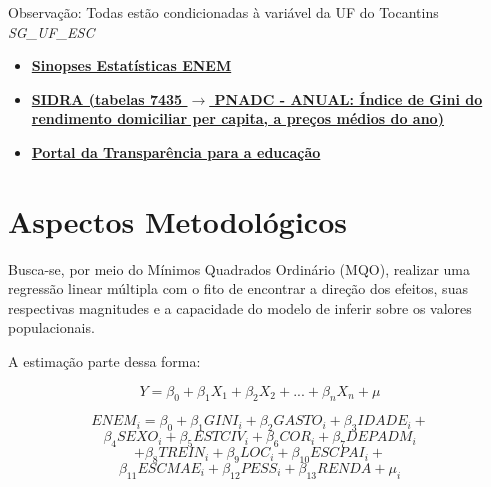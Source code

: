 \documentclass[tcc1,project]{uftex}
\begin{document}
Observação: Todas estão condicionadas à variável da UF do Tocantins \textit{SG\_UF\_ESC}

\begin{itemize}

\item \textbf{\href{https://www.gov.br/inep/pt-br/acesso-a-informacao/dados-abertos/sinopses}{Sinopses Estatísticas ENEM}}

\item \textbf{\href{https://sidra.ibge.gov.br/pesquisa/pnadca/tabelas}{SIDRA (tabelas 7435 $\rightarrow$ PNADC - ANUAL: Índice de Gini do rendimento domiciliar per capita, a preços médios do ano)}}

\item \textbf{\href{https://portaldatransparencia.gov.br/funcoes/12-educacao?ano=2024}{Portal da Transparência para a educação}}

\end{itemize}

\section*{Aspectos Metodológicos}

Busca-se, por meio do Mínimos Quadrados Ordinário (MQO), realizar uma regressão linear múltipla com o fito de encontrar a direção dos efeitos, suas respectivas magnitudes e a capacidade do modelo de inferir sobre os valores populacionais. 

A estimação parte dessa forma:

\begin{equation}	
	Y = \beta_0 + \beta_1X_1 + \beta_2X_2 + ... + \beta_nX_n + \mu  
\end{equation}

\begin{equation}
	ENEM_i = \beta_0 + \beta_1GINI_i + \beta_2GASTO_i + \beta_3IDADE_i +
\end{equation}
\begin{equation*}
	\beta_4SEXO_i + \beta_5ESTCIV_i + \beta_6COR_i + \beta_7DEPADM_i
\end{equation*}
\begin{equation*}
	+ \beta_8TREIN_i + \beta_9LOC_i + \beta_10ESCPAI_i +
\end{equation*}
\begin{equation*}
	\beta_11ESCMAE_i + \beta_12PESS_i + \beta_13RENDA + \mu_i 
\end{equation*}







\appendix
\onehalfspacing	
\end{document}
